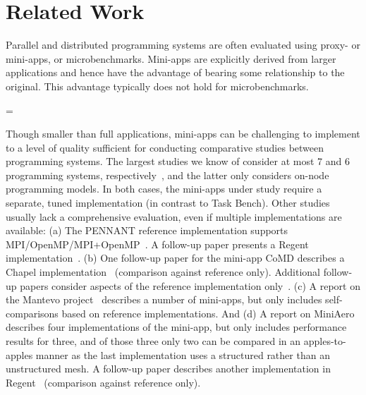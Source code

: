 \section{Related Work}
\label{sec:related-work}

{}

Parallel and distributed programming systems are often
evaluated using proxy- or mini-apps, or
microbenchmarks. Mini-apps are explicitly derived from larger
applications and hence have the advantage of bearing some
relationship to the original. This advantage typically does not hold
for microbenchmarks.

\brokenpenalty=\oldbrokenpenalty



Though smaller than full applications, mini-apps can be challenging to
implement to a level of quality sufficient for conducting comparative
studies between programming systems. {\color{blue} The largest studies
we know of consider at most 7 and 6 programming systems,
respectively~\cite{LULESH13, Deakin19}, and the latter only considers
on-node programming models.} In both cases, the mini-apps under study
require a separate, tuned implementation (in contrast to Task
Bench). Other studies usually lack a comprehensive evaluation, even if
multiple implementations are available:
(a) The PENNANT reference implementation supports
MPI/OpenMP/MPI+OpenMP~\cite{PENNANT}. A follow-up paper presents a
Regent implementation~\cite{Regent15}.
(b) One follow-up paper for the mini-app CoMD describes a Chapel
implementation~\cite{CoMDChapel16} (comparison against reference
only). Additional follow-up papers consider aspects of the reference
implementation only~\cite{CoMDLoadImbalance17,
  CoMDThreadedModels14}.
(c) A report on the Mantevo project~\cite{Mantevo09} describes a number of
mini-apps, but only includes self-comparisons based on reference
implementations.
And (d) A report on MiniAero~\cite{SandiaReportManyTaskRuntimes15} describes
four implementations of the mini-app, but only includes performance
results for three, and of those three only two can be compared in an
apples-to-apples manner as the last implementation uses a structured
rather than an unstructured mesh. A follow-up paper describes another
implementation in Regent~\cite{Regent15} (comparison against reference
only).

